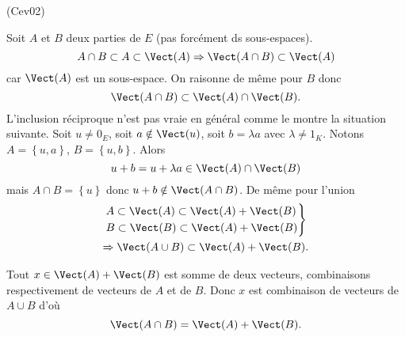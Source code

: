 \begin{tiny}(Cev02)\end{tiny} Soit $A$ et $B$ deux parties de $E$ (pas forcément ds sous-espaces).
\[
  A \cap B \subset A \subset \Vect(A) 
  \Rightarrow \Vect(A\cap B) \subset \Vect(A)
\]
car $\Vect(A)$ est un sous-espace. On raisonne de même pour $B$ donc 
\[
  \Vect(A\cap B) \subset \Vect(A) \cap \Vect(B).
\]
L'inclusion réciproque n'est pas vraie en général comme le montre la situation suivante.\newline
Soit $u\neq 0_E$, soit $a\notin \Vect(u)$, soit $b = \lambda a$ avec $\lambda \neq  1_K$. Notons $A=\left\lbrace u, a\right\rbrace$, $B=\left\lbrace u, b\right\rbrace$. Alors
\[
  u + b = u + \lambda a \in \Vect(A)\cap \Vect(B)
\]
mais $A\cap B= \left\lbrace u\right\rbrace$ donc $u + b \notin \Vect(A\cap B)$.\newline
De même pour l'union
\begin{multline*}
  \left.
  \begin{aligned}
    &A \subset \Vect(A) \subset \Vect(A) + \Vect(B)\\
    &B \subset \Vect(B) \subset \Vect(A) + \Vect(B)
  \end{aligned}
\right\rbrace \\
\Rightarrow \Vect(A \cup B) \subset \Vect(A) + \Vect(B).
\end{multline*}

Tout $x \in \Vect(A) + \Vect(B)$ est somme de deux vecteurs, combinaisons respectivement de vecteurs de $A$ et de $B$. Donc $x$ est combinaison de vecteurs de $A\cup B$ d'où
\[
  \Vect(A\cap B) = \Vect(A) + \Vect(B).
\]
